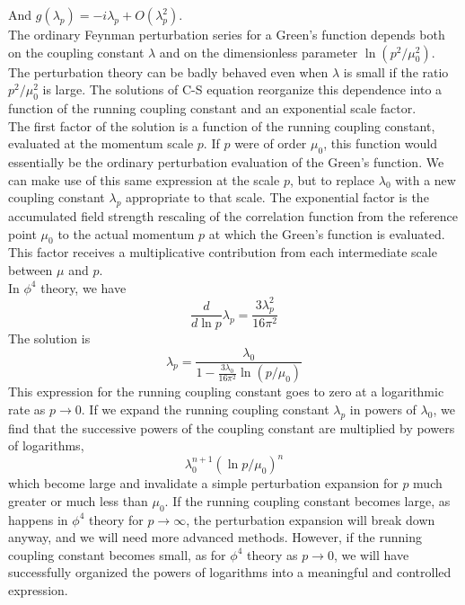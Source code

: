 \documentclass[cyan]{elegantnote}
\begin{document}
And $g(\lambda_p) = -i\lambda_p + O(\lambda_p^2)$.
\\
The ordinary Feynman perturbation series for a Green's function depends both on the coupling constant $\lambda$ and on the dimensionless parameter $\ln(p^2/\mu_0^2)$. The perturbation theory can be badly behaved even when $\lambda$ is small if the ratio $p^2/\mu_0^2$ is large. The solutions of C-S equation reorganize this dependence into a function of the running coupling constant and an exponential scale factor. 
\\
The first factor of the solution is a function of the running coupling constant, evaluated at the momentum scale $p$. If $p$ were of order $\mu_0$, this function would essentially be the ordinary perturbation evaluation of the Green's function. We can make use of this same expression at the scale $p$, but to replace $\lambda_0$ with a new coupling constant $\lambda_p$ appropriate to that scale.
The exponential factor is the accumulated field strength rescaling of the correlation function from the reference point $\mu_0$ to the actual momentum $p$ at which the Green's function is evaluated. This factor receives a multiplicative contribution from each intermediate scale between $\mu$ and $p$.
\\
In $\phi^4$ theory, we have
\[\frac{d}{d\ln p} \lambda_p = \frac{3\lambda_p^2}{16\pi^2}\]
The solution is
\[\lambda_p = \frac{\lambda_0}{1 - \frac{3\lambda_0}{16\pi^2} \ln (p/\mu_0)}\]
This expression for the running coupling constant goes to zero at a logarithmic rate as $p \to 0$. If we expand the running coupling constant $\lambda_p$ in powers of $\lambda_0$, we find that the successive powers of the coupling constant are multiplied by powers of logarithms, 
\[\lambda_0^{n+1}(\ln p/\mu_0)^n\]
which become large and invalidate a simple perturbation expansion for $p$ much greater or much less than $\mu_0$. If the running coupling constant becomes large, as happens in $\phi^4$ theory for $p \to \infty$, the perturbation expansion will break down anyway, and we will need more advanced methods. However, if the running coupling constant becomes small, as for $\phi^4$ theory as $p \to 0$, we will have successfully organized the powers of logarithms into a meaningful and controlled expression.
\end{document}
